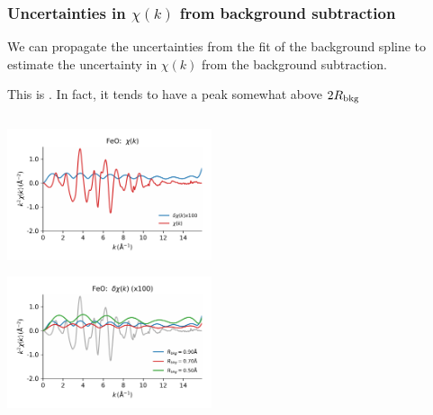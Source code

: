 \begin{frame}\frametitle{ Uncertainties in $\chi(k)$ from background subtraction}

  \begin{cenpage}{135mm}

\vmm
\begin{cenpage}{105mm}

  We can propagate the uncertainties from the fit of the background spline
  to estimate the uncertainty in $\chi(k)$ from the background subtraction.

  \vmm \vmm

  This is {}.   In fact, it tends to have a peak
  somewhat above $2 R_{\rm bkg}$
\end{cenpage}

\begin{columns}
  \begin{column}[T]{60mm}

    { { \includegraphics[width=60mm]{figs/errors/feo_chik_deltachi}}}

    { { \includegraphics[width=60mm]{figs/errors/feo_deltachik_rbkg} }}

    \end{column}

    \begin{column}[T]{60mm}

      {}


\end{column}
\end{columns}
\end{cenpage}
\end{frame}
